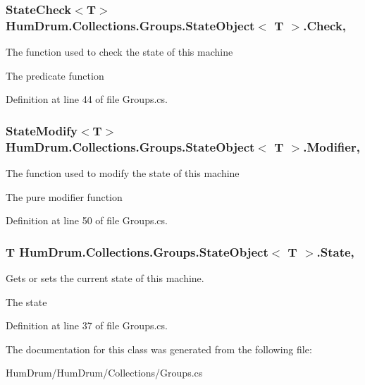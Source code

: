 \subsubsection[{\texorpdfstring{Check}{Check}}]{\setlength{\rightskip}{0pt plus 5cm}State\+Check$<$T$>$ {\bf Hum\+Drum.\+Collections.\+Groups.\+State\+Object}$<$ T $>$.Check\hspace{0.3cm}{\ttfamily [get]}, {\ttfamily [set]}}\hypertarget{classHumDrum_1_1Collections_1_1Groups_1_1StateObject_aca3a9433c50c52f7364d5239d3847749}{}\label{classHumDrum_1_1Collections_1_1Groups_1_1StateObject_aca3a9433c50c52f7364d5239d3847749}


The function used to check the state of this machine 

The predicate function

Definition at line 44 of file Groups.\+cs.

\subsubsection[{\texorpdfstring{Modifier}{Modifier}}]{\setlength{\rightskip}{0pt plus 5cm}State\+Modify$<$T$>$ {\bf Hum\+Drum.\+Collections.\+Groups.\+State\+Object}$<$ T $>$.Modifier\hspace{0.3cm}{\ttfamily [get]}, {\ttfamily [set]}}\hypertarget{classHumDrum_1_1Collections_1_1Groups_1_1StateObject_a0d961b56d3c86f24a5185cb1812285ac}{}\label{classHumDrum_1_1Collections_1_1Groups_1_1StateObject_a0d961b56d3c86f24a5185cb1812285ac}


The function used to modify the state of this machine 

The pure modifier function

Definition at line 50 of file Groups.\+cs.

\subsubsection[{\texorpdfstring{State}{State}}]{\setlength{\rightskip}{0pt plus 5cm}T {\bf Hum\+Drum.\+Collections.\+Groups.\+State\+Object}$<$ T $>$.State\hspace{0.3cm}{\ttfamily [get]}, {\ttfamily [set]}}\hypertarget{classHumDrum_1_1Collections_1_1Groups_1_1StateObject_a192fdeea48e27612063d5099456ec217}{}\label{classHumDrum_1_1Collections_1_1Groups_1_1StateObject_a192fdeea48e27612063d5099456ec217}


Gets or sets the current state of this machine. 

The state

Definition at line 37 of file Groups.\+cs.



The documentation for this class was generated from the following file\+:\begin{DoxyCompactItemize}
\item 
Hum\+Drum/\+Hum\+Drum/\+Collections/Groups.\+cs\end{DoxyCompactItemize}
